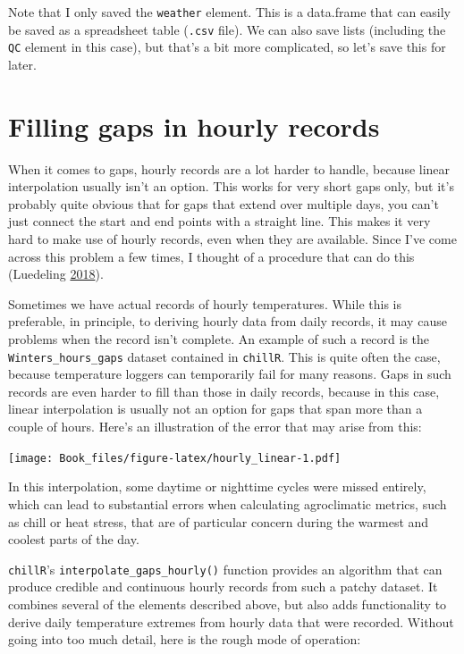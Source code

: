 \documentclass[
]{book}
\begin{document}
Note that I only saved the \texttt{weather} element. This is a data.frame that can easily be saved as a spreadsheet table (\texttt{.csv} file). We can also save lists (including the \texttt{QC} element in this case), but that's a bit more complicated, so let's save this for later.

\hypertarget{filling-gaps-in-hourly-records}{%
\section{Filling gaps in hourly records}\label{filling-gaps-in-hourly-records}}

When it comes to gaps, hourly records are a lot harder to handle, because linear interpolation usually isn't an option. This works for very short gaps only, but it's probably quite obvious that for gaps that extend over multiple days, you can't just connect the start and end points with a straight line. This makes it very hard to make use of hourly records, even when they are available. Since I've come across this problem a few times, I thought of a procedure that can do this (Luedeling \protect\hyperlink{ref-luedeling_interpolating_2018}{2018}).

Sometimes we have actual records of hourly temperatures. While this is preferable, in principle, to deriving hourly data from daily records, it may cause problems when the record isn't complete. An example of such a record is the \texttt{Winters\_hours\_gaps} dataset contained in \texttt{chillR}. This is quite often the case, because temperature loggers can temporarily fail for many reasons. Gaps in such records are even harder to fill than those in daily records, because in this case, linear interpolation is usually not an option for gaps that span more than a couple of hours. Here's an illustration of the error that may arise from this:

\texttt{[image: Book\_files/figure-latex/hourly\_linear-1.pdf]}

In this interpolation, some daytime or nighttime cycles were missed entirely, which can lead to substantial errors when calculating agroclimatic metrics, such as chill or heat stress, that are of particular concern during the warmest and coolest parts of the day.

\texttt{chillR}'s \texttt{interpolate\_gaps\_hourly()} function provides an algorithm that can produce credible and continuous hourly records from such a patchy dataset. It combines several of the elements described above, but also adds functionality to derive daily temperature extremes from hourly data that were recorded. Without going into too much detail, here is the rough mode of operation:
\end{document}
